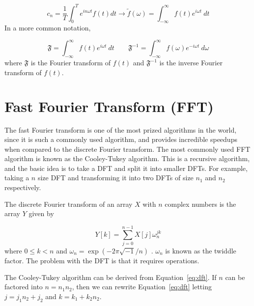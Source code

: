         \begin{equation}
            c_n = \frac{1}{T}\int_0^Te^{in\omega t} f(t) dt \rightarrow
            \tilde{f}(\omega) =\int_{-\infty}^{\infty}f(t)e^{i\omega t}~dt
        \end{equation}
        In a more common notation,

        \begin{equation}
            \mathfrak{F} =\int_{-\infty}^{\infty}f(t)e^{i\omega t}~dt
            \qquad
            \mathfrak{F}^{-1} =\int_{-\infty}^{\infty}f(\omega)e^{-i\omega t}~d\omega
        \end{equation}
        where $\mathfrak{F}$ is the Fourier transform of  $f(t)$ and
        $\mathfrak{F}^{-1}$ is the inverse Fourier transform of $f(t)$.



        \section{Fast Fourier Transform (FFT)}

        The fast Fourier transform is one of the most prized algorithms in the
        world, since it is such a commonly used algorithm, and provides
        incredible speedups when compared to the discrete Fourier transform.
        The most commonly used FFT algorithm is known as the Cooley-Tukey algorithm.
        This is a recursive algorithm, and the basic idea is to take a DFT and split it
        into smaller DFTs. For example, taking a $n$ size DFT and transforming it into
        two DFTs of size $n_1$ and $n_2$ respectively.

        The discrete Fourier transform of an array $X$ with $n$ complex numbers is the array
        $Y$ given by

        \begin{equation}
            Y[k] = \sum_{j=0}^{n-1}X[j]\omega_n^{jk}
            \label{eq:dft}
        \end{equation}
        where $0\le k < n$ and $\omega_n=\exp\left( -2\pi\sqrt{-1}/n \right)$
        \cite{frigo2005design}.
        $\omega_n$ is known as the twiddle factor. The problem
        with the DFT is that it requires  operations.

        The Cooley-Tukey algorithm can be derived from Equation~\ref{eq:dft}. If
        $n$ can be factored into $n=n_1n_2$, then we can rewrite
        Equation~\ref{eq:dft}
        letting $j=j_1n_2+j_2$ and $k=k_1+k_2n_2$.

